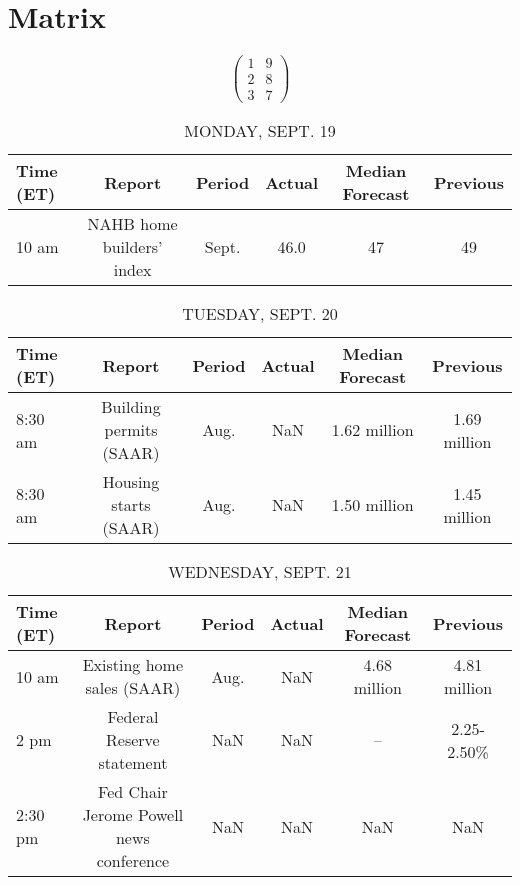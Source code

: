 \documentclass{article}%
\begin{document}
%
\normalsize%
\section{Matrix}%
\label{sec:Matrix}%
\[%
\begin{pmatrix}%
1&9\\%
2&8\\%
3&7%
\end{pmatrix}%
\]

%


\begin{table}[htbp]%
\caption{MONDAY, SEPT. 19}%
\centering%
\begin{adjustbox}{width=1\textwidth}%
\begin{tabular}{lccccc}
\toprule
Time (ET) &                    Report & Period & Actual & Median Forecast & Previous \\
\midrule
    10 am & NAHB home builders' index &  Sept. &   46.0 &              47 &       49 \\
\bottomrule
\end{tabular}
%
\end{adjustbox}%
\end{table}

%


\begin{table}[htbp]%
\caption{TUESDAY, SEPT. 20}%
\centering%
\begin{adjustbox}{width=1\textwidth}%
\begin{tabular}{lccccc}
\toprule
Time (ET) &                  Report & Period & Actual & Median Forecast &     Previous \\
\midrule
  8:30 am & Building permits (SAAR) &   Aug. &    NaN &    1.62 million & 1.69 million \\
  8:30 am &   Housing starts (SAAR) &   Aug. &    NaN &    1.50 million & 1.45 million \\
\bottomrule
\end{tabular}
%
\end{adjustbox}%
\end{table}

%


\begin{table}[htbp]%
\caption{WEDNESDAY, SEPT. 21}%
\centering%
\begin{adjustbox}{width=1\textwidth}%
\begin{tabular}{lccccc}
\toprule
Time (ET) &                                  Report & Period & Actual & Median Forecast &     Previous \\
\midrule
    10 am &              Existing home sales (SAAR) &   Aug. &    NaN &    4.68 million & 4.81 million \\
     2 pm &               Federal Reserve statement &    NaN &    NaN &              -- &   2.25-2.50\% \\
  2:30 pm & Fed Chair Jerome Powell news conference &    NaN &    NaN &             NaN &          NaN \\
\bottomrule
\end{tabular}
%
\end{adjustbox}%
\end{table}
\end{document}
